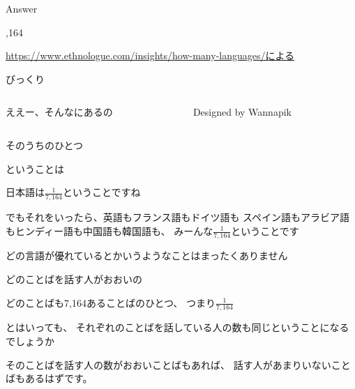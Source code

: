 \documentclass[
  ignorenonframetext,
  aspectratio=169,
  xcolor=dvipsnames]{beamer}
\begin{document}
\begin{frame}{Answer}
\label{answer}
\Huge
\vfill

,164

\vfill

\raggedleft
\scriptsize

\url{https://www.ethnologue.com/insights/how-many-languages/による}
\end{frame}

\begin{frame}{びっくり}
\label{ux3073ux3063ux304fux308a}
\Large

\begin{columns}
    \begin{column}{0.475\textwidth}
      ええー、そんなにあるの
    \end{column}
    \begin{column}{0.475\textwidth}
            {\tiny Designed by Wannapik}
      \end{column}
  \end{columns}
\end{frame}

\begin{frame}{そのうちのひとつ}
\label{ux305dux306eux3046ux3061ux306eux3072ux3068ux3064}
\Large

ということは\pause

日本語は\Huge \phantom{0}\(\frac{1}{7,164}\)\phantom{0}\Large ということですね

\vfill
\pause

でもそれをいったら、\pause 英語もフランス語もドイツ語も\pause
スペイン語もアラビア語もヒンディー語も\pause 中国語も韓国語も、\pause
みーんな\Huge\phantom{0}\(\frac{1}{7,164}\)\phantom{0}\Large ということです

\vfill
\pause

どの言語が優れているとかいうようなことはまったくありません
\end{frame}

\begin{frame}{どのことばを話す人がおおいの}
\label{ux3069ux306eux3053ux3068ux3070ux3092ux8a71ux3059ux4ebaux304cux304aux304aux3044ux306e}
\Large

どのことばも7,164あることばのひとつ、\pause
つまり\Huge\phantom{0}\(\frac{1}{7,164}\)\phantom{0}

\Large
\pause

とはいっても、
それぞれのことばを話している人の数も同じということになるでしょうか

\pause

そのことばを話す人の数がおおいことばもあれば、
話す人があまりいないことばもあるはずです。
\end{frame}
\end{document}

